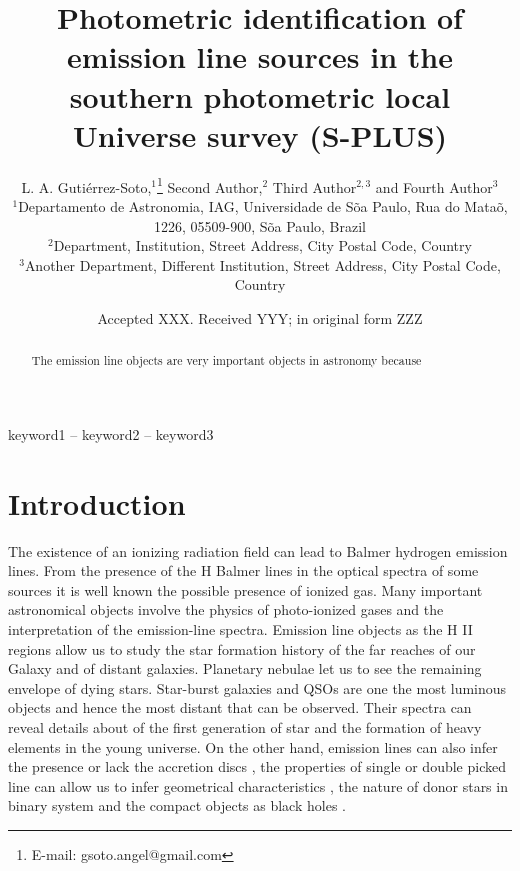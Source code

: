 \documentclass[fleqn,usenatbib]{mnras}
\title[S-PLUS: Emission line objects]{Photometric identification of emission line sources in the southern photometric local Universe survey (S-PLUS)}
\author[Guti\'{e}rrez-Soto et al.]{
L. A. Guti\'{e}rrez-Soto,$^{1}$\thanks{E-mail: gsoto.angel@gmail.com}
Second  Author,$^{2}$
Third Author$^{2,3}$
and Fourth Author$^{3}$
\\
$^{1}$Departamento de Astronomia, IAG, Universidade de S\~{o}a Paulo, Rua do Mata\~{o}, 1226, 05509-900, S\~{o}a Paulo, Brazil\\
$^{2}$Department, Institution, Street Address, City Postal Code, Country\\
$^{3}$Another Department, Different Institution, Street Address, City Postal Code, Country
}
\date{Accepted XXX. Received YYY; in original form ZZZ}
\begin{document}
\label{firstpage}
\pagerange{\pageref{firstpage}--\pageref{lastpage}}
\maketitle

\begin{abstract}
The emission line objects are very important objects in astronomy because 
\end{abstract}

\begin{keywords}
keyword1 -- keyword2 -- keyword3
\end{keywords}



\section{Introduction}

The existence of an ionizing radiation field can lead to Balmer hydrogen emission lines. From the presence  of the H Balmer lines in the optical spectra of some sources it is well known the possible presence of ionized gas. Many important astronomical objects involve the physics of photo-ionized gases and the interpretation of the emission-line spectra. Emission line objects as the H II regions allow us to study the star formation history of the far reaches of our Galaxy and of distant galaxies. Planetary nebulae let us to see the remaining envelope of dying stars. Star-burst galaxies and QSOs are one the most luminous objects and hence the most distant that can be observed. Their spectra can reveal details about of the first generation of star and the formation of heavy elements in the young universe. On the other hand, emission lines can also infer the presence or lack the accretion discs \citep{Schwope:2000, Ratti:2012}, the properties of single or double picked line can allow us to infer geometrical characteristics \citep{Horne:1986}, the nature of  donor stars in binary system \citep{Steeghs:2002, Spaandonk:2010, Casares:2015} and the compact objects as black holes \citep{Casares:2016}. 
\end{document}
